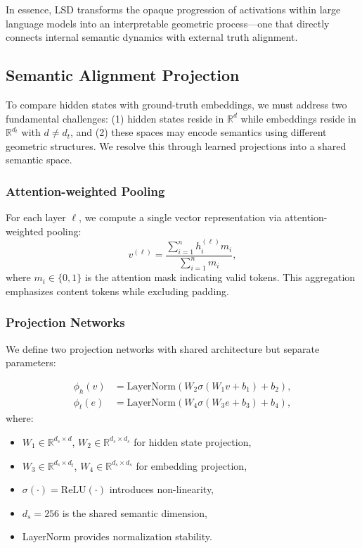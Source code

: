 \documentclass[11pt]{article}
\begin{document}
In essence, LSD transforms the opaque progression of activations within large language models into an interpretable geometric process—one that directly connects internal semantic dynamics with external truth alignment.


\subsection{Semantic Alignment Projection}
\label{sec:alignment}

To compare hidden states with ground-truth embeddings, we must address two fundamental challenges: (1) hidden states reside in $\mathbb{R}^d$ while embeddings reside in $\mathbb{R}^{d_t}$ with $d \neq d_t$, and (2) these spaces may encode semantics using different geometric structures. We resolve this through learned projections into a shared semantic space.

\subsubsection{Attention-weighted Pooling}

For each layer $\ell$, we compute a single vector representation via attention-weighted pooling:
\begin{equation}
v^{(\ell)} = \frac{\sum_{i=1}^{n} h_i^{(\ell)} m_i}{\sum_{i=1}^{n} m_i},
\label{eq:pooling}
\end{equation}
where $m_i \in \{0, 1\}$ is the attention mask indicating valid tokens. This aggregation emphasizes content tokens while excluding padding.

\subsubsection{Projection Networks}

We define two projection networks with shared architecture but separate parameters:

\begin{align}
\phi_h(v) &= \text{LayerNorm}(W_2 \sigma(W_1 v + b_1) + b_2), \label{eq:proj_h} \\
\phi_t(e) &= \text{LayerNorm}(W_4 \sigma(W_3 e + b_3) + b_4), \label{eq:proj_t}
\end{align}
where:
\begin{itemize}[leftmargin=*]
    \item $W_1 \in \mathbb{R}^{d_s \times d}$, $W_2 \in \mathbb{R}^{d_s \times d_s}$ for hidden state projection,
    \item $W_3 \in \mathbb{R}^{d_s \times d_t}$, $W_4 \in \mathbb{R}^{d_s \times d_s}$ for embedding projection,
    \item $\sigma(\cdot) = \text{ReLU}(\cdot)$ introduces non-linearity,
    \item $d_s = 256$ is the shared semantic dimension,
    \item LayerNorm provides normalization stability.
\end{itemize}
\end{document}

